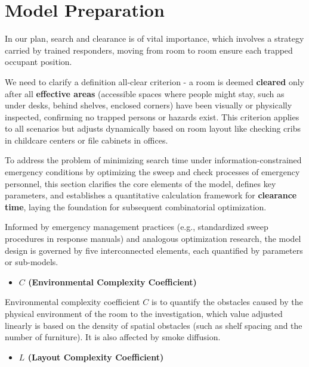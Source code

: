\section{Model Preparation}
\vspace{-0.3cm}%

In our plan, search and clearance is of vital importance, which involves a strategy carried by trained responders, moving from room to room ensure each trapped occupant position.

We need to clarify a definition all-clear criterion - a room is deemed \textbf{cleared} only after all \textbf{effective areas} (accessible spaces where people might stay, such as under desks, behind shelves, enclosed corners) have been visually or physically inspected, confirming no trapped persons or hazards exist. This criterion applies to all scenarios but adjusts dynamically based on room layout like checking cribs in childcare centers or file cabinets in offices.

To address the problem of minimizing search time under information-constrained emergency conditions by optimizing the sweep and check processes of emergency personnel, this section clarifies the core elements of the model, defines key parameters, and establishes a quantitative calculation framework for \textbf{clearance time}, laying the foundation for subsequent combinatorial optimization.

Informed by emergency management practices (e.g., standardized sweep procedures in response manuals)
and analogous optimization research, the model design is governed by five interconnected elements, each quantified by parameters or sub-models.

    \begin{itemize}
    \item \textbf{$C$ (Environmental Complexity Coefficient)} 
    \end{itemize}
    
    Environmental complexity coefficient $C$ is to quantify the obstacles caused by the physical environment of the room to the investigation, which value adjusted linearly is based on the density of spatial obstacles (such as shelf spacing and the number of furniture). It is also affected by smoke diffusion.

    
    \begin{itemize}
    \item \textbf{$L$ (Layout Complexity Coefficient)} 
    \end{itemize}
    
